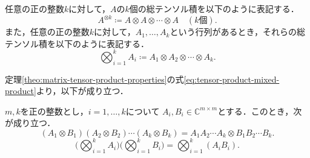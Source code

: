 \begin{defi}[テンソル積の記法]
  任意の正の整数$k$に対して，$A$の$k$個の総テンソル積を以下のように表記する．
  \[
    A^{\otimes k} \coloneq A\otimes A\otimes\cdots\otimes A \quad(k\text{個}).
  \]
  また，任意の正の整数$k$に対して，$A_1,\ldots,A_k$という行列があるとき，それらの総テンソル積を以下のように表記する．
  \[
    \bigotimes_{i=1}^k A_i \coloneq A_1\otimes A_2\otimes\cdots\otimes A_k.
  \]
\end{defi}
定理\ref{theo:matrix-tensor-product-properties}の式\eqref{eq:tensor-product-mixed-product}より，以下が成り立つ．
\begin{theo}
  $m,k$を正の整数とし，$i=1,\ldots,k$について
  $A_i,B_i\in\mathbb{C}^{m\times m}$とする．このとき，次が成り立つ．
  \begin{equation*}
    (A_1\otimes B_1)(A_2\otimes B_2)\cdots(A_k\otimes B_k)
    = A_1A_2\cdots A_k \otimes B_1B_2\cdots B_k.
  \end{equation*}
  \begin{equation*}
    \Bigg(\bigotimes_{i=1}^k A_i\Bigg) \Bigg(\bigotimes_{i=1}^k B_i\Bigg)
    =\bigotimes_{i=1}^k (A_i B_i).
  \end{equation*}
\end{theo}
